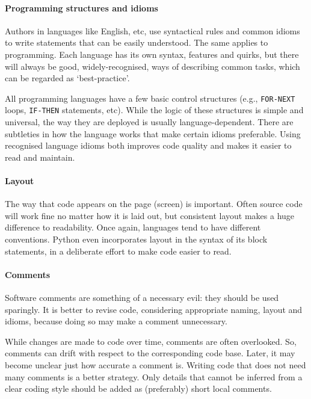 \paragraph{Programming structures and idioms} Authors in languages like English, etc, use syntactical rules and common idioms to write statements that can be easily understood. The same applies to programming. Each language has its own syntax, features and quirks, but there will always be good, widely-recognised, ways of describing common tasks, which can be regarded as `best-practice'.

All programming languages have a few basic control structures (e.g., \texttt{FOR-NEXT} loops, \texttt{IF-THEN} statements, etc). While the logic of these structures is simple and universal, the way they are deployed is usually language-dependent. There are subtleties in how the language works that make certain idioms preferable. Using recognised language idioms both improves code quality and makes it easier to read and maintain. 

  

\paragraph{Layout} The way that code appears on the page (screen) is important. Often source code will work fine no matter how it is laid out, but consistent layout makes a huge difference to readability. Once again, languages tend to have different conventions. Python even incorporates layout in the syntax of its block statements, in a deliberate effort to make code easier to read.

\paragraph{Comments} Software comments are something of a necessary evil: they should be used sparingly. It is better to revise code, considering appropriate naming, layout and idioms, because doing so may make a comment unnecessary.

While changes are made to code over time, comments are often overlooked. So, comments can drift with respect to the corresponding code base. Later, it may become unclear just how accurate a comment is. Writing code that does not need many comments is a better strategy. Only details that cannot be inferred from a clear coding style should be added as (preferably) short local comments.

